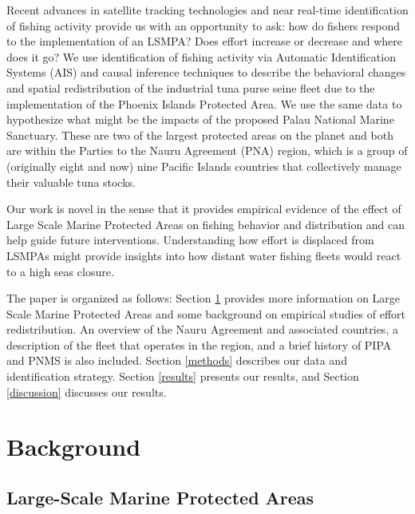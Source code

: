 \documentclass[9pttwoside,lineno]{pnas-new}
\begin{document}
Recent advances in satellite tracking technologies and near real-time
identification of fishing activity provide us with an opportunity to ask: how do fishers respond to the implementation of an LSMPA? Does effort increase or decrease and where does it go? We use identification of fishing activity via Automatic
Identification Systems (AIS) and causal inference techniques to describe
the behavioral changes and spatial redistribution of the industrial tuna
purse seine fleet due to the implementation of the Phoenix Islands Protected Area. We use the same data to hypothesize what might be the impacts of the proposed Palau National Marine Sanctuary. These are two of the largest protected areas on the planet and both are within the Parties to the Nauru Agreement (PNA) region, which is a group of (originally eight and now) nine Pacific Islands countries that collectively manage their valuable tuna stocks.

Our work is novel in the sense that it provides empirical evidence of
the effect of Large Scale Marine Protected Areas on fishing behavior and
distribution and can help guide future interventions. Understanding how
effort is displaced from LSMPAs might provide insights into how distant water fishing fleets would react to a high seas closure.

The paper is organized as follows: Section \ref{background} provides more
information on Large Scale Marine Protected Areas and some background on
empirical studies of effort redistribution. An overview of the Nauru
Agreement and associated countries, a description of the fleet that
operates in the region, and a brief history of PIPA and PNMS is also included.
Section \ref{methods} describes our data and identification strategy.
Section \ref{results} presents our results, and Section \ref{discussion}
discusses our
results.

\section{Background}\label{background}

\subsection{Large-Scale Marine Protected Areas}\label{lsmpas}
\end{document}
